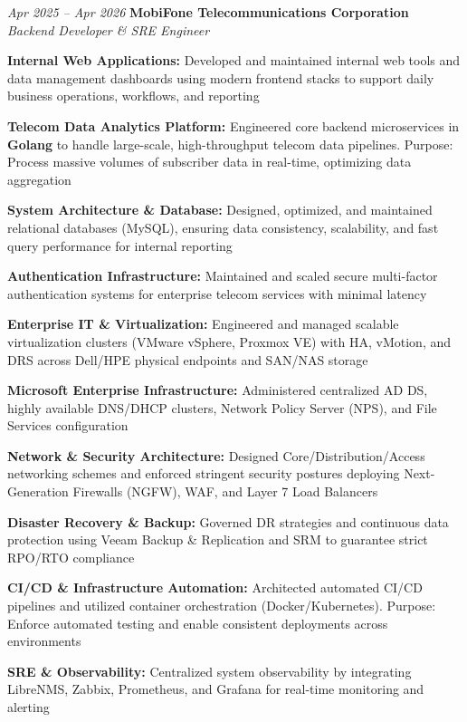 \begin{twocolentry}{\textit{Apr 2025 -- Apr 2026}}
    \textbf{MobiFone Telecommunications Corporation} \\[4pt]
    \textit{Backend Developer \& SRE Engineer}
\end{twocolentry}
\begin{onecolentry}
    \begin{highlights}
        \item \textbf{Internal Web Applications:} Developed and maintained internal web tools and data management dashboards using modern frontend stacks to support daily business operations, workflows, and reporting
        \item \textbf{Telecom Data Analytics Platform:} Engineered core backend microservices in \textbf{Golang} to handle large-scale, high-throughput telecom data pipelines. Purpose: Process massive volumes of subscriber data in real-time, optimizing data aggregation
        \item \textbf{System Architecture \& Database:} Designed, optimized, and maintained relational databases (MySQL), ensuring data consistency, scalability, and fast query performance for internal reporting
        \item \textbf{Authentication Infrastructure:} Maintained and scaled secure multi-factor authentication systems for enterprise telecom services with minimal latency
        \item \textbf{Enterprise IT \& Virtualization:} Engineered and managed scalable virtualization clusters (VMware vSphere, Proxmox VE) with HA, vMotion, and DRS across Dell/HPE physical endpoints and SAN/NAS storage
        \item \textbf{Microsoft Enterprise Infrastructure:} Administered centralized AD DS, highly available DNS/DHCP clusters, Network Policy Server (NPS), and File Services configuration
        \item \textbf{Network \& Security Architecture:} Designed Core/Distribution/Access networking schemes and enforced stringent security postures deploying Next-Generation Firewalls (NGFW), WAF, and Layer 7 Load Balancers
        \item \textbf{Disaster Recovery \& Backup:} Governed DR strategies and continuous data protection using Veeam Backup \& Replication and SRM to guarantee strict RPO/RTO compliance
        \item \textbf{CI/CD \& Infrastructure Automation:} Architected automated CI/CD pipelines and utilized container orchestration (Docker/Kubernetes). Purpose: Enforce automated testing and enable consistent deployments across environments
        \item \textbf{SRE \& Observability:} Centralized system observability by integrating LibreNMS, Zabbix, Prometheus, and Grafana for real-time monitoring and alerting
    \end{highlights}
\end{onecolentry}
\vspace{0.2 cm}

